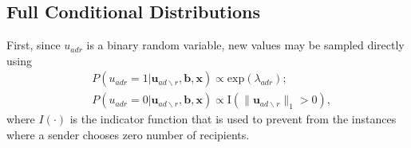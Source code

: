 \documentclass[ba]{imsart}
\numberwithin{equation}{section}
\theoremstyle{plain}
\begin{document}
\subsection{Full Conditional Distributions}\label{subsec:conditionaldist}
First, since $u_{adr}$ is a binary random variable, new values may be sampled directly using
\begin{equation}
\begin{aligned}
&P(u_{adr}=1| \boldsymbol{u}_{ad\backslash r}, \boldsymbol{b}, \boldsymbol{x})
\propto \mbox{exp}(\lambda_{adr});\\
&P(u_{adr}=0| \boldsymbol{u}_{ad\backslash r},\boldsymbol{b}, \boldsymbol{x})\propto \text{I}(\lVert\boldsymbol{u}_{ad\backslash r}\rVert_1 > 0 ),
\end{aligned}
\label{eqn:latentreceiver}
\end{equation}
where $I(\cdot)$ is the indicator function that is used to prevent from the instances where a sender chooses zero number of recipients.
\end{document}
